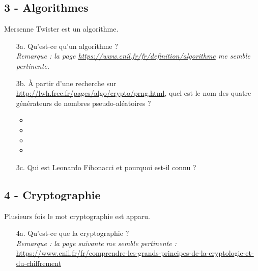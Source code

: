 \newpage

\subsection*{3 - Algorithmes}

Mersenne Twister est un algorithme. 

\begin{enumerate}
    \item[3a.] Qu’est-ce qu'un algorithme ? \\
    \textit{Remarque : la page \url{https://www.cnil.fr/fr/definition/algorithme} me semble pertinente.} \\
    \Pointilles[8]

    \item[3b.] À partir d'une recherche  sur \url{http://lwh.free.fr/pages/algo/crypto/prng.html}, quel est le nom des quatre générateurs de nombres pseudo-aléatoires ?
    
    \begin{itemize}[label={$\bullet$}]
        \item \dotfill
        \item \dotfill
        \item \dotfill
        \item \dotfill
    \end{itemize} 

    \item[3c.] Qui est Leonardo Fibonacci et pourquoi est-il connu ? \\ \Pointilles[8]
\end{enumerate} 

\subsection*{4 - Cryptographie}

Plusieurs fois le mot cryptographie est apparu. 

\begin{enumerate}
    \item[4a.] Qu'est-ce que la cryptographie ? \\
\textit{Remarque : la page suivante me semble pertinente :} \\
\url{https://www.cnil.fr/fr/comprendre-les-grands-principes-de-la-cryptologie-et-du-chiffrement} \\ \Pointilles[6]
\end{enumerate} 

